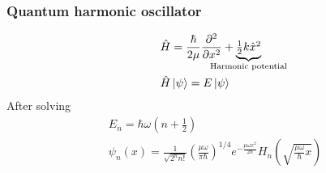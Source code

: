 \documentclass[12pt, fleqn]{beamer}
\begin{document}
\begin{frame}
    \frametitle{Quantum harmonic oscillator}
        \begin{align}
            &\hat{H} = \frac{\hbar}{2\mu} \pdv[2]{}{x} + {\underbrace{\textstyle \frac{1}{2} k \hat{x}^2}_{\mathclap{\text{Harmonic potential}}}} \nonumber \\
            &\hat{H}\ket{\psi} = E \ket{\psi} \nonumber
        \end{align}
        \pause
        After solving 
        \begin{align}
            &E_n = \hbar \omega \left(n +\frac{1}{2}\right) \nonumber \\
            &\psi_n(x) = \frac{1}{\sqrt{2^n n!}} \left(\frac{\mu \omega}{\pi \hbar}\right)^{1/4} e^{-\frac{\mu \omega x^2}{2 \hbar}} H_n\left( \sqrt{\frac{\mu \omega}{\hbar} x}\right) \nonumber
        \end{align}

\end{frame}
\end{document}
